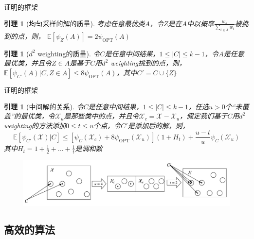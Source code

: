 \documentclass[notheorems]{beamer}
\newcommand{\E}{\mathbb{E}}
\newtheorem{lemma}[theorem]{引理}
\begin{document}
\begin{CJK*}{UTF8}{gbsn}
\begin{frame}{证明的框架}
	\begin{lemma}[均匀采样的解的质量]
		考虑任意最优类$A$，令$Z$是在$A$中以概率$\frac{w_z}{\sum_{i \in A} w_i}$被挑到的点，则， $\E[\psi_Z(A)] = 2 \psi_{\text{OPT}}(A)$
	\end{lemma}
	\begin{lemma}[$d^2$ weighting的质量]
		令$C$是任意中间结果，$1 \leq |C| \leq k-1$，令$A$是任意最优类，并且令$Z \in A$是基于$C$用$d^2$ weighting挑到的点，则，$\E[\psi_{C'}(A)|C,Z \in A] \leq 8 \psi_{\text{OPT}}(A)$，其中$C' = C \cup \{Z\}$
	\end{lemma}
\end{frame}

\begin{frame}{证明的框架}
	\begin{lemma}[中间解的关系]
		\footnotesize
		令$C$是任意中间结果，$1 \leq |C| \leq k-1$，任选$u>0$个“未覆盖”的最优类，令$\mathcal{X}_u$是那些类中的点，并且令$\mathcal{X}_c = \mathcal{X} - \mathcal{X}_u$，假定我们基于$C$用$d^2$ weighting的方法添加$0 \leq t \leq u$个点，令$C'$是添加后的解，则， 
		\begin{equation}
		\E[\psi_{C'}(\mathcal{X})|C] \leq [\psi_C(\mathcal{X}_c)+8\psi_{\text{OPT}}(\mathcal{X}_u)](1+H_t)+\frac{u-t}{u}\psi_C(\mathcal{X}_u)
		\end{equation}
		其中$H_t = 1+\frac{1}{2}+...+\frac{1}{t}$是调和数
	\end{lemma}
	\begin{figure}
		\centering
		\includegraphics[scale=0.4]{lemma_relationships.png}
	\end{figure}
\end{frame}

\subsection{高效的算法}



\end{CJK*}
\end{document}
